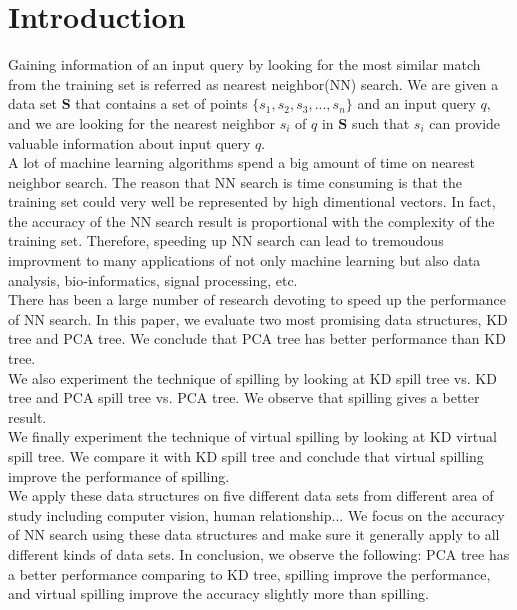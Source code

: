 \documentclass[paper=letter, fontsize=12pt]{article} %
\begin{document}
\section{Introduction}
Gaining information of an input query by looking for the most similar match from the training set is referred as nearest neighbor(NN) search. We are given a data set $\mathbf S$ that contains a set of points $\{ s_1, s_2, s_3, ... , s_n\}$ and an input query $q$, and we are looking for the nearest neighbor $s_i$ of $q$ in $\mathbf S$ such that $s_i$ can provide valuable information about input query $q$.\\
\hspace*{2em} A lot of machine learning algorithms spend a big amount of time on nearest neighbor search. The reason that NN search is time consuming is that the training set could very well be represented by high dimentional vectors. In fact, the accuracy of the NN search result is proportional with the complexity of the training set. Therefore, speeding up NN search can lead to tremoudous improvment to many applications of not only machine learning but also data analysis, bio-informatics, signal processing, etc.\\
\hspace*{2em} There has been a large number of research devoting to speed up the performance of NN search. In this paper, we evaluate two most promising data structures, KD tree and PCA tree. We conclude that PCA tree has better performance than KD tree.\\
\hspace*{2em} We also experiment the technique of spilling by looking at KD spill tree vs. KD tree and PCA spill tree vs. PCA tree. We observe that spilling gives a better result.\\
\hspace*{2em} We finally experiment the technique of virtual spilling by looking at KD virtual spill tree. We compare it with KD spill tree and conclude that virtual spilling improve the performance of spilling.\\
\hspace*{2em} We apply these data structures on five different data sets from different area of study including computer vision, human relationship... We focus on the accuracy of NN search using these data structures and make sure it generally apply to all different kinds of data sets. In conclusion, we observe the following: PCA tree has a better performance comparing to KD tree, spilling improve the performance, and virtual spilling improve the accuracy slightly more than spilling.
\end{document}

